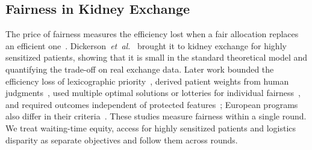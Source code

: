 \documentclass[journal]{IEEEtran}
\begin{document}
\subsection{Fairness in Kidney Exchange}
\label{sec:related:fairness}

The price of fairness measures the efficiency lost when a fair
allocation replaces an efficient
one~\cite{bertsimas2011price,caragiannis2012efficiency}.
Dickerson~\textit{et~al.}~\cite{dickerson2014price} brought it to kidney exchange for highly sensitized patients, showing that it is small in the standard theoretical model and quantifying the trade-off on real exchange data. Later work bounded the efficiency loss
of lexicographic priority~\cite{mcelfresh2018balancing}, derived patient
weights from human judgments~\cite{freedman2020adapting}, used multiple
optimal solutions or lotteries for individual
fairness~\cite{farnadi2021individual,starnaud2025adaptation,chang2026optimizing},
and required outcomes independent of protected
features~\cite{zhang2026fairness}; European programs also differ in their
criteria~\cite{biro2021modelling}. These studies measure fairness within
a single round. We treat waiting-time equity, access for highly
sensitized patients and logistics disparity as separate objectives and
follow them across rounds.
\end{document}
